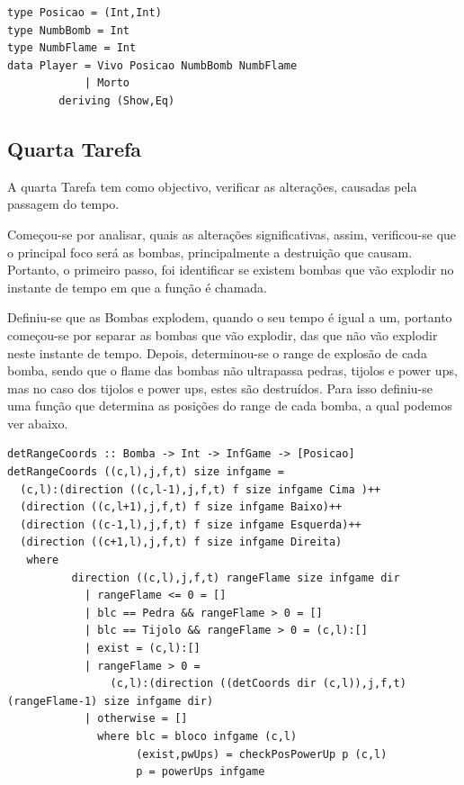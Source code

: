 \documentclass[4apaper]{report}
\begin{document}
\begin{verbatim}
type Posicao = (Int,Int)
type NumbBomb = Int
type NumbFlame = Int
data Player = Vivo Posicao NumbBomb NumbFlame
            | Morto
        deriving (Show,Eq)
\end{verbatim}

\subsection{Quarta Tarefa}

A quarta Tarefa tem como objectivo, verificar as alterações, causadas pela passagem do tempo.

%

Começou-se por analisar, quais as alterações significativas, assim, verificou-se que o principal foco será as bombas, principalmente a destruição que causam. Portanto, o primeiro passo, foi identificar se existem bombas que vão explodir no instante de tempo em que a função é chamada. 

Definiu-se que as Bombas explodem, quando o seu tempo é igual a um, portanto começou-se por separar as bombas que vão explodir, das que não vão explodir neste instante de tempo. Depois, determinou-se o range de explosão de cada bomba, sendo que o flame das bombas não ultrapassa pedras, tijolos e power ups, mas no caso dos tijolos e power ups, estes são destruídos. Para isso definiu-se uma função que determina as posições do range de cada bomba, a qual podemos ver abaixo.

\begin{verbatim}
detRangeCoords :: Bomba -> Int -> InfGame -> [Posicao]
detRangeCoords ((c,l),j,f,t) size infgame = 
  (c,l):(direction ((c,l-1),j,f,t) f size infgame Cima )++
  (direction ((c,l+1),j,f,t) f size infgame Baixo)++
  (direction ((c-1,l),j,f,t) f size infgame Esquerda)++
  (direction ((c+1,l),j,f,t) f size infgame Direita)
   where 
          direction ((c,l),j,f,t) rangeFlame size infgame dir 
            | rangeFlame <= 0 = []
            | blc == Pedra && rangeFlame > 0 = []
            | blc == Tijolo && rangeFlame > 0 = (c,l):[] 
            | exist = (c,l):[]
            | rangeFlame > 0 = 
            	(c,l):(direction ((detCoords dir (c,l)),j,f,t) (rangeFlame-1) size infgame dir)
            | otherwise = []
              where blc = bloco infgame (c,l) 
                    (exist,pwUps) = checkPosPowerUp p (c,l)
                    p = powerUps infgame
\end{verbatim}
\end{document}
